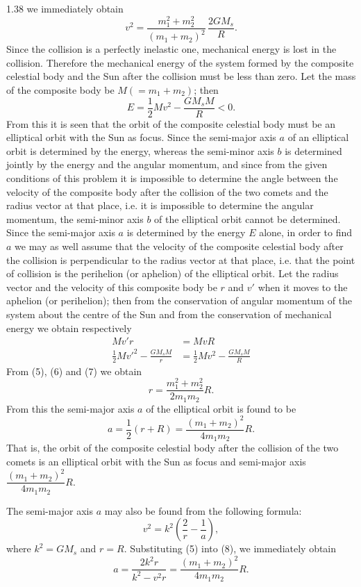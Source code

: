 \begin{solution}{1.38}
we immediately obtain
\begin{equation}
v^2=\frac{m_1^2+m_2^2}{(m_1+m_2)^2}\,\frac{2GM_s}{R}. \tag{5}
\end{equation}
Since the collision is a perfectly inelastic one, mechanical energy is lost in the collision. Therefore the mechanical energy of the system formed by the composite celestial body and the Sun after the collision must be less than zero. Let the mass of the composite body be $M(=m_1+m_2)$; then
\[
E=\frac{1}{2}Mv^2-\frac{GM_sM}{R}<0.
\]
From this it is seen that the orbit of the composite celestial body must be an elliptical orbit with the Sun as focus. Since the semi-major axis $a$ of an elliptical orbit is determined by the energy, whereas the semi-minor axis $b$ is determined jointly by the energy and the angular momentum, and since from the given conditions of this problem it is impossible to determine the angle between the velocity of the composite body after the collision of the two comets and the radius vector at that place, i.e. it is impossible to determine the angular momentum, the semi-minor axis $b$ of the elliptical orbit cannot be determined. Since the semi-major axis $a$ is determined by the energy $E$ alone, in order to find $a$ we may as well assume that the velocity of the composite celestial body after the collision is perpendicular to the radius vector at that place, i.e. that the point of collision is the perihelion (or aphelion) of the elliptical orbit. Let the radius vector and the velocity of this composite body be $r$ and $v'$ when it moves to the aphelion (or perihelion); then from the conservation of angular momentum of the system about the centre of the Sun and from the conservation of mechanical energy we obtain respectively
\begin{align}
Mv'r &= MvR \tag{6}\\
\frac{1}{2}Mv'^2-\frac{GM_sM}{r} &= \frac{1}{2}Mv^2-\frac{GM_sM}{R} \tag{7}
\end{align}
From (5), (6) and (7) we obtain
\[
r=\frac{m_1^2+m_2^2}{2m_1m_2}R.
\]
From this the semi-major axis $a$ of the elliptical orbit is found to be
\[
a=\frac{1}{2}(r+R)=\frac{(m_1+m_2)^2}{4m_1m_2}R.
\]
That is, the orbit of the composite celestial body after the collision of the two comets is an elliptical orbit with the Sun as focus and semi-major axis $\dfrac{(m_1+m_2)^2}{4m_1m_2}R$.

The semi-major axis $a$ may also be found from the following formula:
\begin{equation}
v^2=k^2\left(\frac{2}{r}-\frac{1}{a}\right), \tag{8}
\end{equation}
where $k^2=GM_s$ and $r=R$. Substituting (5) into (8), we immediately obtain
\[
a=\frac{2k^2r}{k^2-v^2r}=\frac{(m_1+m_2)^2}{4m_1m_2}R.
\]

\end{solution}

